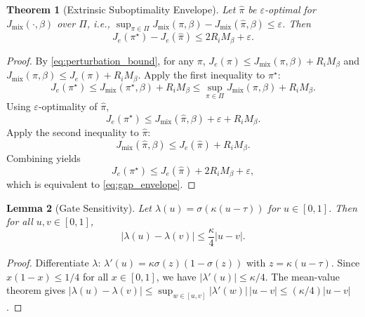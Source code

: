 \documentclass{article} %
\newtheorem{theorem}{Theorem}[section]
\newtheorem{lemma}[theorem]{Lemma}
\begin{document}
\begin{theorem}[Extrinsic Suboptimality Envelope]
\label{thm:gap}
Let $\hat\pi$ be $\varepsilon$-optimal for $J_{\mathrm{mix}}(\cdot,\beta)$ over $\Pi$, i.e.,
$\sup_{\pi\in\Pi}J_{\mathrm{mix}}(\pi,\beta)-J_{\mathrm{mix}}(\hat\pi,\beta)\le\varepsilon$.
Then
\begin{equation}
\label{eq:gap_envelope}
J_e(\pi^\star)-J_e(\hat\pi)\le 2R_iM_\beta+\varepsilon.
\end{equation}
\end{theorem}
\begin{proof}
By \eqref{eq:perturbation_bound}, for any $\pi$,
$J_e(\pi)\le J_{\mathrm{mix}}(\pi,\beta)+R_iM_\beta$ and
$J_{\mathrm{mix}}(\pi,\beta)\le J_e(\pi)+R_iM_\beta$.
Apply the first inequality to $\pi^\star$:
\[
J_e(\pi^\star)\le J_{\mathrm{mix}}(\pi^\star,\beta)+R_iM_\beta
\le \sup_{\pi\in\Pi}J_{\mathrm{mix}}(\pi,\beta)+R_iM_\beta.
\]
Using $\varepsilon$-optimality of $\hat\pi$,
\[
J_e(\pi^\star)\le J_{\mathrm{mix}}(\hat\pi,\beta)+\varepsilon+R_iM_\beta.
\]
Apply the second inequality to $\hat\pi$:
\[
J_{\mathrm{mix}}(\hat\pi,\beta)\le J_e(\hat\pi)+R_iM_\beta.
\]
Combining yields
\[
J_e(\pi^\star)\le J_e(\hat\pi)+2R_iM_\beta+\varepsilon,
\]
which is equivalent to \eqref{eq:gap_envelope}.
\end{proof}

\begin{lemma}[Gate Sensitivity]
\label{lem:lipschitz}
Let $\lambda(u)=\sigma(\kappa(u-\tau))$ for $u\in[0,1]$. Then for all $u,v\in[0,1]$,
\begin{equation}
\label{eq:lipschitz}
|\lambda(u)-\lambda(v)|\le \frac{\kappa}{4}|u-v|.
\end{equation}
\end{lemma}
\begin{proof}
Differentiate $\lambda$: $\lambda'(u)=\kappa\sigma(z)(1-\sigma(z))$ with $z=\kappa(u-\tau)$. Since $x(1-x)\le 1/4$ for all $x\in[0,1]$, we have $|\lambda'(u)|\le\kappa/4$. The mean-value theorem gives
$|\lambda(u)-\lambda(v)|\le\sup_{w\in[u,v]}|\lambda'(w)|\,|u-v|\le(\kappa/4)|u-v|$.
\end{proof}
\end{document}

